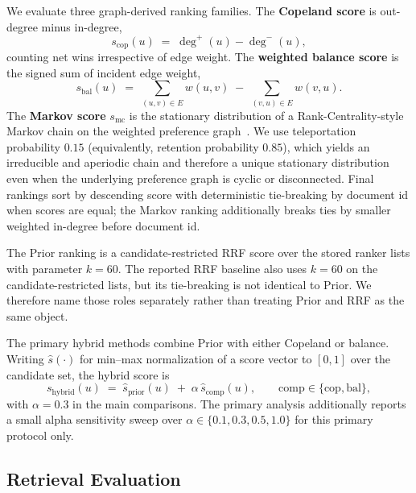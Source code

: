 \documentclass[manuscript,anonymous,review]{acmart}
\begin{document}
We evaluate three graph-derived ranking families. The \textbf{Copeland score}
is out-degree minus in-degree,
\begin{equation}
  s_{\mathrm{cop}}(u) \;=\; \deg^+(u) - \deg^-(u),
  \label{eq:copeland}
\end{equation}
counting net wins irrespective of edge weight. The \textbf{weighted balance
score} is the signed sum of incident edge weight,
\begin{equation}
  s_{\mathrm{bal}}(u) \;=\; \sum_{(u,v)\in E} w(u,v) \;-\; \sum_{(v,u)\in E} w(v,u).
  \label{eq:balance}
\end{equation}
The \textbf{Markov score} $s_{\mathrm{mc}}$ is the stationary distribution of
a Rank-Centrality-style Markov chain on the weighted preference
graph~\cite{negahban2017rankcentrality}. We use teleportation probability
$0.15$ (equivalently, retention probability $0.85$), which yields an
irreducible and aperiodic chain and therefore a unique stationary distribution
even when the underlying preference graph is cyclic or disconnected. Final
rankings sort by descending score with deterministic tie-breaking by document
id when scores are equal; the Markov ranking additionally breaks ties by
smaller weighted in-degree before document id.

The Prior ranking is a candidate-restricted RRF score over the stored ranker
lists with parameter $k=60$. The reported RRF baseline also uses $k=60$ on the
candidate-restricted lists, but its tie-breaking is not identical to Prior.
We therefore name those roles separately rather than treating Prior and RRF as
the same object.

The primary hybrid methods combine Prior with either Copeland or balance.
Writing $\hat{s}(\cdot)$ for min--max normalization of a score vector to
$[0,1]$ over the candidate set, the hybrid score is
\begin{equation}
  s_{\mathrm{hybrid}}(u) \;=\; \hat{s}_{\mathrm{prior}}(u) \;+\; \alpha\, \hat{s}_{\mathrm{comp}}(u),
  \qquad \mathrm{comp} \in \{\mathrm{cop}, \mathrm{bal}\},
  \label{eq:hybrid}
\end{equation}
with $\alpha=0.3$ in the main comparisons. The primary analysis additionally
reports a small alpha sensitivity sweep over $\alpha \in \{0.1,0.3,0.5,1.0\}$
for this primary protocol only.

\subsection{Retrieval Evaluation}
\label{sec:retrieval-metrics}
\end{document}
